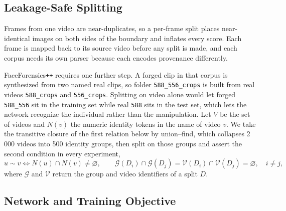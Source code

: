 \documentclass[journal,onecolumn]{IEEEtran}
\begin{document}
\subsection{Leakage-Safe Splitting}
\label{ssec:splitting}

Frames from one video are near-duplicates, so a per-frame split places
near-identical images on both sides of the boundary and inflates every score.
Each frame is mapped back to its source video before any split is made, and each
corpus needs its own parser because each encodes provenance differently.

FaceForensics\texttt{++} requires one further step. A forged clip in that corpus
is synthesized from two named real clips, so folder \texttt{588\_556\_crops} is
built from real videos \texttt{588\_crops} and \texttt{556\_crops}. Splitting on
video alone would let forged \texttt{588\_556} sit in the training set while real
\texttt{588} sits in the test set, which lets the network recognize the
individual rather than the manipulation. Let $V$ be the set of videos and $N(v)$
the numeric identity tokens in the name of video $v$. We take the transitive
closure of the first relation below by union--find, which collapses 2\,000 videos
into 500 identity groups, then split on those groups and assert the second
condition in every experiment,
\begin{equation}
  u \sim v \iff N(u) \cap N(v) \neq \varnothing ,
  \qquad
  \mathcal{G}(D_i) \cap \mathcal{G}(D_j) = \mathcal{V}(D_i) \cap \mathcal{V}(D_j)
  = \varnothing , \quad i \neq j,
  \label{eq:identity}
\end{equation}
where $\mathcal{G}$ and $\mathcal{V}$ return the group and video identifiers of a
split $D$.

\subsection{Network and Training Objective}
\end{document}
